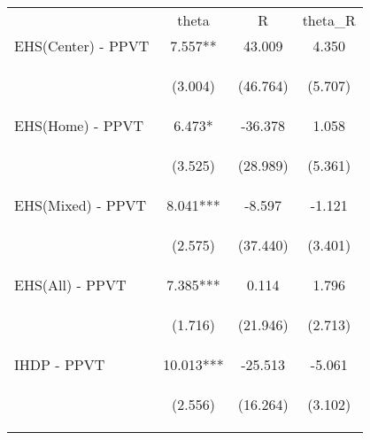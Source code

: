 \begin{tabular}{lccc}
\hline \noalign{\smallskip} & theta & R & theta_R\\
\noalign{\smallskip}\hline \noalign{\smallskip}EHS(Center) - PPVT & 7.557** & 43.009 & 4.350\\
 & \begin{footnotesize}(3.004)\end{footnotesize} & \begin{footnotesize}(46.764)\end{footnotesize} & \begin{footnotesize}(5.707)\end{footnotesize}\\
\noalign{\smallskip}EHS(Home) - PPVT & 6.473* & -36.378 & 1.058\\
 & \begin{footnotesize}(3.525)\end{footnotesize} & \begin{footnotesize}(28.989)\end{footnotesize} & \begin{footnotesize}(5.361)\end{footnotesize}\\
\noalign{\smallskip}EHS(Mixed) - PPVT & 8.041*** & -8.597 & -1.121\\
 & \begin{footnotesize}(2.575)\end{footnotesize} & \begin{footnotesize}(37.440)\end{footnotesize} & \begin{footnotesize}(3.401)\end{footnotesize}\\
\noalign{\smallskip}EHS(All) - PPVT & 7.385*** & 0.114 & 1.796\\
 & \begin{footnotesize}(1.716)\end{footnotesize} & \begin{footnotesize}(21.946)\end{footnotesize} & \begin{footnotesize}(2.713)\end{footnotesize}\\
\noalign{\smallskip}IHDP - PPVT & 10.013*** & -25.513 & -5.061\\
 & \begin{footnotesize}(2.556)\end{footnotesize} & \begin{footnotesize}(16.264)\end{footnotesize} & \begin{footnotesize}(3.102)\end{footnotesize}\\

\end{tabular}
